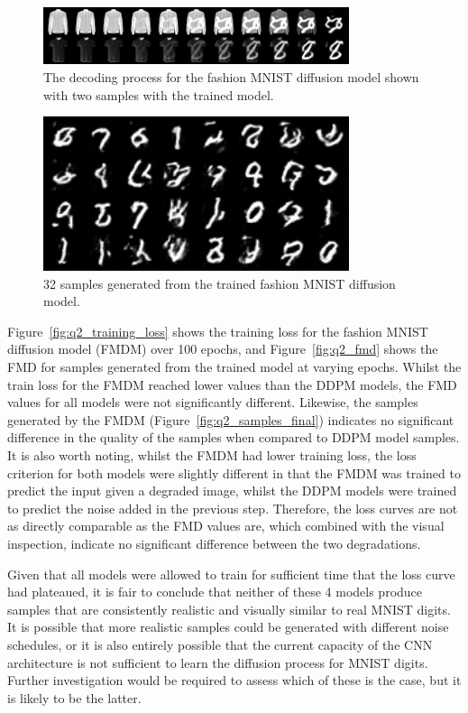\begin{figure}[t]
    \centering
    \includegraphics[width=0.8\textwidth]{figures/q2_decoding}
    \caption{The decoding process for the fashion MNIST diffusion model shown with two samples with the trained model.}
    \label{fig:q2_decoding}
\end{figure}

\begin{figure}[t]
    \centering
    \includegraphics[width=0.8\textwidth]{figures/q2_samples_final}
    \caption{32 samples generated from the trained fashion MNIST diffusion model.}
    \label{fig:q2_samples_final}
\end{figure}

Figure~\eqref{fig:q2_training_loss} shows the training loss for the fashion MNIST diffusion model (FMDM) over 100 epochs, and
Figure~\eqref{fig:q2_fmd} shows the FMD for samples generated from the trained model at varying epochs.
Whilst the train loss for the FMDM reached lower values than the DDPM models, the FMD values for all models were
not significantly different.
Likewise, the samples generated by the FMDM (Figure~\eqref{fig:q2_samples_final}) indicates no significant difference
in the quality of the samples when compared to DDPM model samples.
It is also worth noting, whilst the FMDM had lower training loss, the loss criterion for both models were slightly
different in that the FMDM was trained to predict the input  given a degraded image, whilst the DDPM models
were trained to predict the noise added in the previous step.
Therefore, the loss curves are not as directly comparable as the FMD values are, which combined with the visual inspection,
indicate no significant difference between the two degradations.

Given that all models were allowed to train for sufficient time that the loss curve had plateaued, it is fair to conclude
that neither of these 4 models produce samples that are consistently realistic and visually similar to real MNIST
digits.
It is possible that more realistic samples could be generated with different noise schedules, or it is also
entirely possible that the current capacity of the CNN architecture is not sufficient to learn the diffusion process
for MNIST digits.
Further investigation would be required to assess which of these is the case, but it is likely to be the latter.
